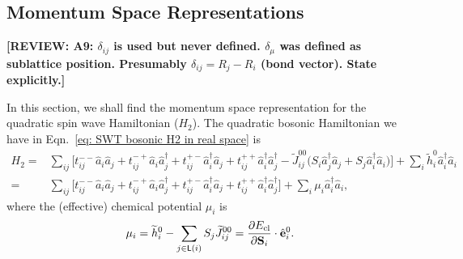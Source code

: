 \documentclass[aps, prx, nofootinbib, superscriptaddress]{revtex4-2}
\newcommand{\REVIEW}[1]{{\color{reviewcolor}\bfseries [REVIEW: #1]}}
\begin{document}
\subsection{Momentum Space Representations}
\REVIEW{A9: $\delta_{ij}$ is used but never defined. $\delta_\mu$ was defined as sublattice position. Presumably $\delta_{ij} = R_j - R_i$ (bond vector). State explicitly.}

In this section, we shall find the momentum space representation for the quadratic spin wave Hamiltonian ($H_{2}$).
The quadratic bosonic Hamiltonian we have in Eqn.~\eqref{eq: SWT bosonic H2 in real space} is 
\begin{equation}
    \begin{split}
        H_{2} = & \sum_{ij}
        \Big[ t_{ij}^{--} \hat{a}_{i} \hat{a}_{j} + t_{ij}^{-+} \hat{a}_{i}\hat{a}_{j}^{\dagger} + t_{ij}^{+-} \hat{a}_{i}^{\dagger} \hat{a}_{j} + t_{ij}^{++} \hat{a}^{\dagger}_{i} \hat{a}^{\dagger}_{j} - \widetilde{J}_{ij}^{00} \big( S_{i} \hat{a}_{j}^{\dagger} \hat{a}_{j} + S_{j} \hat{a}_{i}^{\dagger} \hat{a}_{i} \big) \Big]  + \sum_{i} \widetilde{h}^{0}_{i} \hat{a}^{\dagger}_{i}\hat{a}_{i} \\
        = & \sum_{ij} 
        \Big[ t_{ij}^{--} \hat{a}_{i} \hat{a}_{j} + t_{ij}^{-+} \hat{a}_{i}\hat{a}_{j}^{\dagger} + t_{ij}^{+-} \hat{a}_{i}^{\dagger} \hat{a}_{j} + t_{ij}^{++} \hat{a}^{\dagger}_{i} \hat{a}^{\dagger}_{j} \Big] 
        + \sum_{i} \mu_{i} \hat{a}^{\dagger}_{i} \hat{a}_{i}, 
    \end{split}
\end{equation}
where the (effective) chemical potential $\mu_{i}$ is 
\begin{equation}
    \mu_{i} = \widetilde{h}^{0}_{i} - \sum_{j \in \mathsf{L}(i)} S_{j} \widetilde{J}^{00}_{ij} = \frac{\partial E_{\rm cl}}{\partial \mathbf{S}_{i}} \cdot \hat{\mathbf{e}}_{i}^{0}.
\end{equation}
\end{document}
